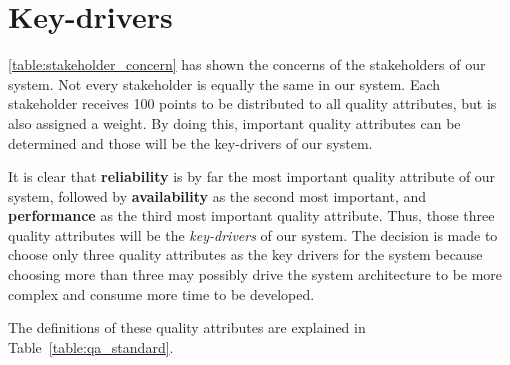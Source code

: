 \section{Key-drivers}

\autoref{table:stakeholder_concern} has shown the concerns of the stakeholders of our system. Not every stakeholder is equally the same in our system. Each stakeholder receives 100 points to be distributed to all quality attributes, but is also assigned a weight. By doing this, important quality attributes can be determined and those will be the key-drivers of our system.

It is clear that \textbf{reliability} is by far the most important quality attribute of our system, followed by \textbf{availability} as the second most important, and \textbf{performance} as the third most important quality attribute. Thus, those three quality attributes will be the \textit{key-drivers} of our system. The decision is made to choose only three quality attributes as the key drivers for the system because choosing more than three may possibly drive the system architecture to be more complex and consume more time to be developed.

The definitions of these quality attributes are explained in Table~\ref{table:qa_standard}.
